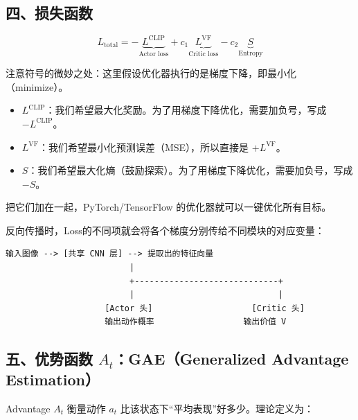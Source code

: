\hypertarget{ux56dbux635fux5931ux51fdux6570-1}{%
\subsection{四、损失函数}\label{ux56dbux635fux5931ux51fdux6570-1}}

\[
L_{\mathrm{total}}=-\underbrace{L^{\mathrm{CLIP}}}_{\text{Actor loss}}+c_1\underbrace{L^{\mathrm{VF}}}_{\text{Critic loss}}-c_2\underbrace{S}_{\text{Entropy}}
\]

注意符号的微妙之处：这里假设优化器执行的是梯度下降，即最小化（minimize）。

\begin{itemize}
\tightlist
\item
  \(L^{\mathrm{CLIP}}\)：我们希望最大化奖励。为了用梯度下降优化，需要加负号，写成 \(-L^{\mathrm{CLIP}}\)。
\item
  \(L^{\mathrm{VF}}\)：我们希望最小化预测误差（MSE），所以直接是 \(+L^{\mathrm{VF}}\)。
\item
  \(S\)：我们希望最大化熵（鼓励探索）。为了用梯度下降优化，需要加负号，写成 \(-S\)。
\end{itemize}

把它们加在一起，PyTorch/TensorFlow 的优化器就可以一键优化所有目标。

反向传播时，Loss的不同项就会将各个梯度分别传给不同模块的对应变量：

\begin{verbatim}
输入图像 --> [共享 CNN 层] --> 提取出的特征向量
                         |
                         +-----------------------------+
                         |                             |
                    [Actor 头]                    [Critic 头]
                    输出动作概率                  输出价值 V
\end{verbatim}

\hypertarget{ux4e94ux4f18ux52bfux51fdux6570-a_tgaegeneralized-advantage-estimation}{%
\subsection{\texorpdfstring{五、优势函数 \(A_t\)：GAE（Generalized Advantage Estimation）}{五、优势函数 A\_t：GAE（Generalized Advantage Estimation）}}\label{ux4e94ux4f18ux52bfux51fdux6570-a_tgaegeneralized-advantage-estimation}}

Advantage \(A_t\) 衡量动作 \(a_t\) 比该状态下``平均表现''好多少。理论定义为：

